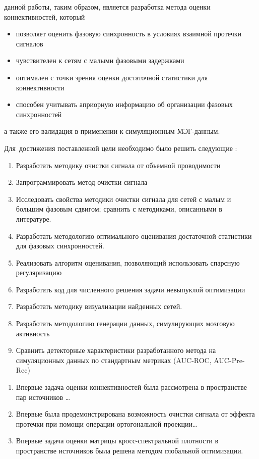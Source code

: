{\aim} данной работы, таким образом, является разработка метода
оценки коннективностей, который
\begin{itemize}
        \item позволяет оценить фазовую синхронность в условиях взаимной протечки сигналов
        \item чувствителен к сетям с малыми фазовыми задержками
        \item оптимален с точки зрения оценки достаточной статистики для коннективности
        \item способен учитывать априорную информацию об организации фазовых синхронностей
\end{itemize}
а также его валидация в применении к симуляционным МЭГ-данным.

Для~достижения поставленной цели необходимо было решить следующие {\tasks}:
\begin{enumerate}
  \item Разработать методику очистки сигнала от объемной проводимости
  \item Запрограммировать метод очистки сигнала
  \item Исследовать свойства методики очистки сигнала
        для сетей с малым и большим фазовым сдвигом;
        сравнить с методиками, описанными в литературе.
  \item Разработать методологию оптимального оценивания достаточной статистики
        для фазовых синхронностей.
  \item Реализовать алгоритм оценивания, позволяющий использовать спарсную регуляризацию
  \item Разработать код для численного решения задачи невыпуклой оптимизации
  \item Разработать методику визуализации найденных сетей.
  \item Разработать методологию генерации данных, симулирующих мозговую активность
  \item Сравнить детекторные характеристики разработанного метода на симуляционных данных
        по стандартным метриках (AUC-ROC, AUC-Pre-Rec)
\end{enumerate}


{\novelty}
\begin{enumerate}
  \item Впервые задача оценки коннективностей была рассмотрена в пространстве пар источников \ldots
  \item Впервые была продемонстрирована возможность очистки сигнала от эффекта протечки 
        при помощи операции ортогональной проекции\ldots
  \item Впервые задача оценки матрицы кросс-спектральной плотности в пространстве источников
        была решена методом глобальной оптимизации.
\end{enumerate}


